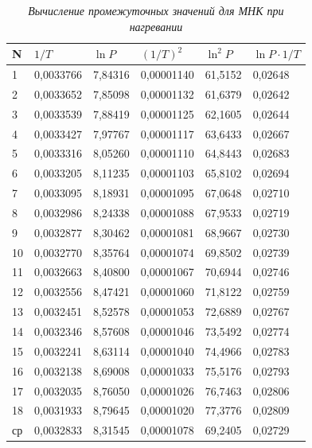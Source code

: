 \documentclass[a4paper,12pt]{article}
\begin{document}
\begin{table}[!h]
    \centering
    \begin{tabular}{|l|l|l|l|l|l|}
    \hline
        N & $1/T$ & $\ln{P} $& $(1/T)^2$ & $\ln^2{P}$ & $\ln{P} \cdot 1/T$ \\ \hline
        1 & 0,0033766 & 7,84316 & 0,00001140 & 61,5152 & 0,02648 \\ \hline
        2 & 0,0033652 & 7,85098 & 0,00001132 & 61,6379 & 0,02642 \\ \hline
        3 & 0,0033539 & 7,88419 & 0,00001125 & 62,1605 & 0,02644 \\ \hline
        4 & 0,0033427 & 7,97767 & 0,00001117 & 63,6433 & 0,02667 \\ \hline
        5 & 0,0033316 & 8,05260 & 0,00001110 & 64,8443 & 0,02683 \\ \hline
        6 & 0,0033205 & 8,11235 & 0,00001103 & 65,8102 & 0,02694 \\ \hline
        7 & 0,0033095 & 8,18931 & 0,00001095 & 67,0648 & 0,02710 \\ \hline
        8 & 0,0032986 & 8,24338 & 0,00001088 & 67,9533 & 0,02719 \\ \hline
        9 & 0,0032877 & 8,30462 & 0,00001081 & 68,9667 & 0,02730 \\ \hline
        10 & 0,0032770 & 8,35764 & 0,00001074 & 69,8502 & 0,02739 \\ \hline
        11 & 0,0032663 & 8,40800 & 0,00001067 & 70,6944 & 0,02746 \\ \hline
        12 & 0,0032556 & 8,47421 & 0,00001060 & 71,8122 & 0,02759 \\ \hline
        13 & 0,0032451 & 8,52578 & 0,00001053 & 72,6889 & 0,02767 \\ \hline
        14 & 0,0032346 & 8,57608 & 0,00001046 & 73,5492 & 0,02774 \\ \hline
        15 & 0,0032241 & 8,63114 & 0,00001040 & 74,4966 & 0,02783 \\ \hline
        16 & 0,0032138 & 8,69008 & 0,00001033 & 75,5176 & 0,02793 \\ \hline
        17 & 0,0032035 & 8,76050 & 0,00001026 & 76,7463 & 0,02806 \\ \hline
        18 & 0,0031933 & 8,79645 & 0,00001020 & 77,3776 & 0,02809 \\ \hline
        ср & 0,0032833 & 8,31545 & 0,00001078 & 69,2405 & 0,02729 \\ \hline
    \end{tabular}\caption{\textit{Вычисление промежуточных значений для МНК при нагревании}}\label{mnk-1}
\end{table}
\end{document}
